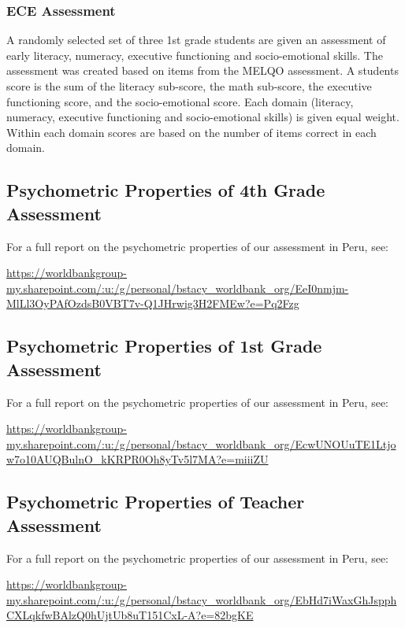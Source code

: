 \documentclass[]{article}
\begin{document}
\hypertarget{ece-assessment}{%
\subsubsection{ECE Assessment}\label{ece-assessment}}

A randomly selected set of three 1st grade students are given an
assessment of early literacy, numeracy, executive functioning and
socio-emotional skills. The assessment was created based on items from
the MELQO assessment. A students score is the sum of the literacy
sub-score, the math sub-score, the executive functioning score, and the
socio-emotional score. Each domain (literacy, numeracy, executive
functioning and socio-emotional skills) is given equal weight. Within
each domain scores are based on the number of items correct in each
domain.

\hypertarget{psychometric-properties-of-4th-grade-assessment}{%
\subsection{Psychometric Properties of 4th Grade
Assessment}\label{psychometric-properties-of-4th-grade-assessment}}

For a full report on the psychometric properties of our assessment in
Peru, see:

\url{https://worldbankgroup-my.sharepoint.com/:u:/g/personal/bstacy_worldbank_org/EeI0nmjm-MlLl3OyPAfOzdsB0VBT7v-Q1JHrwig3H2FMEw?e=Pq2Fzg}

\hypertarget{psychometric-properties-of-1st-grade-assessment}{%
\subsection{Psychometric Properties of 1st Grade
Assessment}\label{psychometric-properties-of-1st-grade-assessment}}

For a full report on the psychometric properties of our assessment in
Peru, see:

\url{https://worldbankgroup-my.sharepoint.com/:u:/g/personal/bstacy_worldbank_org/EcwUNOUuTE1Ltjow7o10AUQBulnO_kKRPR0Oh8yTv5l7MA?e=miiiZU}

\hypertarget{psychometric-properties-of-teacher-assessment}{%
\subsection{Psychometric Properties of Teacher
Assessment}\label{psychometric-properties-of-teacher-assessment}}

For a full report on the psychometric properties of our assessment in
Peru, see:

\url{https://worldbankgroup-my.sharepoint.com/:u:/g/personal/bstacy_worldbank_org/EbHd7iWaxGhJspphCXLqkfwBAlzQ0hUjtUb8uT151CxL-A?e=82bgKE}
\end{document}
